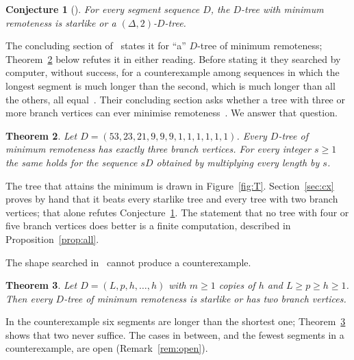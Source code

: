 \documentclass[11pt]{amsart}
\newtheorem{thm}{Theorem}[section]
\newtheorem{conj}[thm]{Conjecture}
\theoremstyle{definition}
\begin{document}
\begin{conj}[{\cite[Conjecture~4.4]{ADHM}}]\label{conj}
For every segment sequence $D$, the $D$-tree with minimum remoteness is starlike or a $(\Delta,2)$-$D$-tree.
\end{conj}

The concluding section of~\cite{ADHM} states it for ``a'' $D$-tree of minimum remoteness; Theorem~\ref{thm:main}
below refutes it in either reading. Before stating it they searched by computer, without success, for a counterexample among sequences in which the
longest segment is much longer than the second, which is much longer than all the others, all equal~\cite[\S4]{ADHM}.
Their concluding section asks whether a tree with three or more branch vertices can ever minimise
remoteness~\cite[\S7]{ADHM}. We answer that question.

\begin{thm}\label{thm:main}
Let $D=(53,23,21,9,9,9,1,1,1,1,1,1)$. Every $D$-tree of minimum remoteness has exactly three branch vertices. For
every integer $s\ge1$ the same holds for the sequence $sD$ obtained by multiplying every length by $s$.
\end{thm}

The tree that attains the minimum is drawn in Figure~\ref{fig:T}. Section~\ref{sec:cx} proves by hand that it beats
every starlike tree and every tree with two branch vertices; that alone refutes Conjecture~\ref{conj}. The statement
that no tree with four or five branch vertices does better is a finite computation, described in
Proposition~\ref{prop:all}.

The shape searched in~\cite{ADHM} cannot produce a counterexample.

\begin{thm}\label{thm:family}
Let $D=(L,p,h,\dots,h)$ with $m\ge1$ copies of $h$ and $L\ge p\ge h\ge1$. Then every $D$-tree of minimum remoteness
is starlike or has two branch vertices.
\end{thm}

In the counterexample six segments are longer than the shortest one; Theorem~\ref{thm:family} shows that two never
suffice. The cases in between, and the fewest segments in a counterexample, are open (Remark~\ref{rem:open}).
\end{document}

